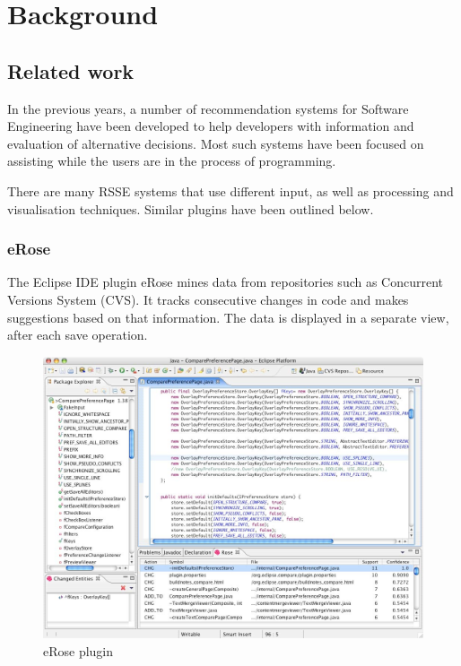 \documentclass{l4proj}
\begin{document}
\chapter{Background}

\section{Related work}

In the previous years, a number of recommendation systems for Software Engineering have been developed to help developers with information and evaluation of alternative decisions. Most such systems have been focused on assisting while the users are in the process of programming.

There are many RSSE systems that use different input, as well as processing and visualisation techniques. Similar plugins have been outlined below.

\subsection{eRose}
The Eclipse IDE plugin eRose mines data from repositories such as Concurrent Versions System (CVS). It tracks consecutive changes in code and makes suggestions based on that information. The data is displayed in a separate view, after each save operation.

\begin{figure}[H]
\includegraphics[scale=0.4]{rose}
\centering
\caption{eRose plugin}\label{rose}
\label{fig:rose}
\end{figure}
\end{document}
